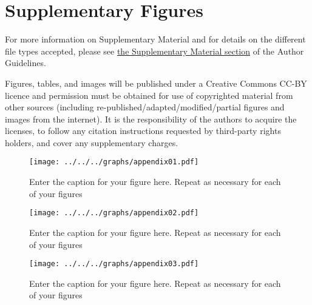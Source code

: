 \documentclass[utf8]{frontiers_suppmat} %
\begin{document}
\onecolumn
{}

\title[Supplementary Material]{{}}


\maketitle

\section{Supplementary Figures}

For more information on Supplementary Material and for details on the different file types accepted, please see \href{http://home.frontiersin.org/about/author-guidelines#SupplementaryMaterial}{the Supplementary Material section} of the Author Guidelines.

Figures, tables, and images will be published under a Creative Commons CC-BY licence and permission must be obtained for use of copyrighted material from other sources (including re-published/adapted/modified/partial figures and images from the internet). It is the responsibility of the authors to acquire the licenses, to follow any citation instructions requested by third-party rights holders, and cover any supplementary charges.

\begin{figure}[htbp]
    \begin{center}
        \texttt{[image: ../../../graphs/appendix01.pdf]}%
    \end{center}
    \caption{ Enter the caption for your figure here.  Repeat as  necessary for each of your figures}\label{fig:1}
\end{figure}

\clearpage
\begin{figure}[htbp]
    \begin{center}
        \texttt{[image: ../../../graphs/appendix02.pdf]}%
    \end{center}
    \caption{ Enter the caption for your figure here.  Repeat as  necessary for each of your figures}\label{fig:2}
\end{figure}

\clearpage
\begin{figure}[htbp]
    \begin{center}
        \texttt{[image: ../../../graphs/appendix03.pdf]}%
    \end{center}
    \caption{ Enter the caption for your figure here.  Repeat as  necessary for each of your figures}\label{fig:3}
\end{figure}
\end{document}
